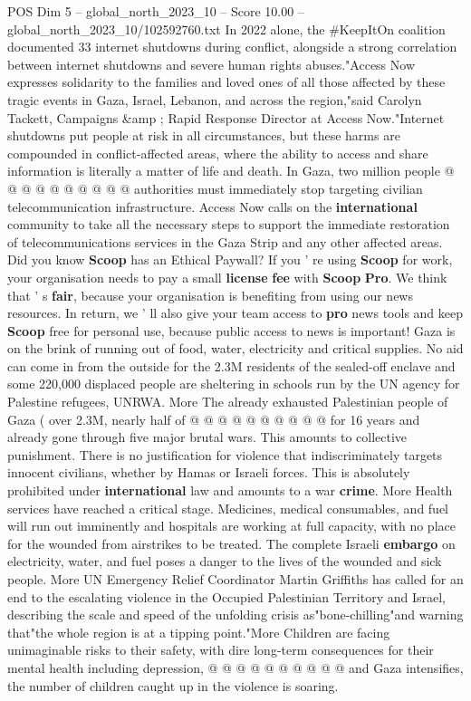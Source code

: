 \begin{textsample}{POS Dim 5 – global\_north\_2023\_10 – Score 10.00 – global\_north\_2023\_10/102592760.txt}
In 2022 alone, the \#KeepItOn coalition documented 33 internet shutdowns during conflict, alongside a strong correlation between internet shutdowns and severe human rights abuses."Access Now expresses solidarity to the families and loved ones of all those affected by these tragic events in Gaza, Israel, Lebanon, and across the region,"said Carolyn Tackett, Campaigns \&amp ; Rapid Response Director at Access Now."Internet shutdowns put people at risk in all circumstances, but these harms are compounded in conflict-affected areas, where the ability to access and share information is literally a matter of life and death.
In Gaza, two million people @ @ @ @ @ @ @ @ @ @ authorities must immediately stop targeting civilian telecommunication infrastructure.
Access Now calls on the \textbf{international} community to take all the necessary steps to support the immediate restoration of telecommunications services in the Gaza Strip and any other affected areas.
Did you know \textbf{Scoop} has an Ethical Paywall?
If you ' re using \textbf{Scoop} for work, your organisation needs to pay a small \textbf{license} \textbf{fee} with \textbf{Scoop} \textbf{Pro}.
We think that ' s \textbf{fair}, because your organisation is benefiting from using our news resources.
In return, we ' ll also give your team access to \textbf{pro} news tools and keep \textbf{Scoop} free for personal use, because public access to news is important!
Gaza is on the brink of running out of food, water, electricity and critical supplies.
No aid can come in from the outside for the 2.3M residents of the sealed-off enclave and some 220,000 displaced people are sheltering in schools run by the UN agency for Palestine refugees, UNRWA.
More The already exhausted Palestinian people of Gaza ( over 2.3M, nearly half of @ @ @ @ @ @ @ @ @ @ for 16 years and already gone through five major brutal wars.
This amounts to collective punishment.
There is no justification for violence that indiscriminately targets innocent civilians, whether by Hamas or Israeli forces.
This is absolutely prohibited under \textbf{international} law and amounts to a war \textbf{crime}.
More Health services have reached a critical stage.
Medicines, medical consumables, and fuel will run out imminently and hospitals are working at full capacity, with no place for the wounded from airstrikes to be treated.
The complete Israeli \textbf{embargo} on electricity, water, and fuel poses a danger to the lives of the wounded and sick people.
More UN Emergency Relief Coordinator Martin Griffiths has called for an end to the escalating violence in the Occupied Palestinian Territory and Israel, describing the scale and speed of the unfolding crisis as"bone-chilling"and warning that"the whole region is at a tipping point."More Children are facing unimaginable risks to their safety, with dire long-term consequences for their mental health including depression, @ @ @ @ @ @ @ @ @ @ and Gaza intensifies, the number of children caught up in the violence is soaring.

\end{textsample}
